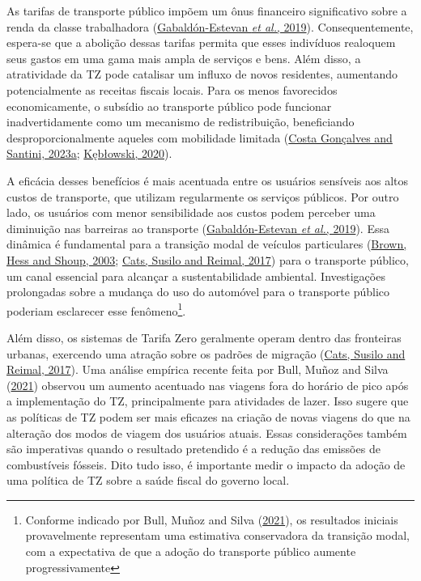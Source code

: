\documentclass[12pt, a4paper, twoside]{article}
\numberwithin{equation}{subsection} %
\begin{document}
As tarifas de transporte público impõem um ônus financeiro significativo
sobre a renda da classe trabalhadora
(\protect\hyperlink{ref-Gabaldon_ffpt_2019}{Gabaldón-Estevan \emph{et
al.}, 2019}). Consequentemente, espera-se que a abolição dessas tarifas
permita que esses indivíduos realoquem seus gastos em uma gama mais
ampla de serviços e bens. Além disso, a atratividade da TZ pode
catalisar um influxo de novos residentes, aumentando potencialmente as
receitas fiscais locais. Para os menos favorecidos economicamente, o
subsídio ao transporte público pode funcionar inadvertidamente como um
mecanismo de redistribuição, beneficiando desproporcionalmente aqueles
com mobilidade limitada
(\protect\hyperlink{ref-Costa_Gonuxe7alves_Santini_2023}{Costa Gonçalves
and Santini, 2023a};
\protect\hyperlink{ref-keblowski_why_2020}{Kębłowski, 2020}).

A eficácia desses benefícios é mais acentuada entre os usuários
sensíveis aos altos custos de transporte, que utilizam regularmente os
serviços públicos. Por outro lado, os usuários com menor sensibilidade
aos custos podem perceber uma diminuição nas barreiras ao transporte
(\protect\hyperlink{ref-Gabaldon_ffpt_2019}{Gabaldón-Estevan \emph{et
al.}, 2019}). Essa dinâmica é fundamental para a transição modal de
veículos particulares (\protect\hyperlink{ref-Brown_2003}{Brown, Hess
and Shoup, 2003}; \protect\hyperlink{ref-cats_prospects_2017}{Cats,
Susilo and Reimal, 2017}) para o transporte público, um canal essencial
para alcançar a sustentabilidade ambiental. Investigações prolongadas
sobre a mudança do uso do automóvel para o transporte público poderiam
esclarecer esse fenômeno\footnote{Conforme indicado por Bull, Muñoz and
  Silva (\protect\hyperlink{ref-BULL-RCT-2021}{2021}), os resultados
  iniciais provavelmente representam uma estimativa conservadora da
  transição modal, com a expectativa de que a adoção do transporte
  público aumente progressivamente}.

Além disso, os sistemas de Tarifa Zero geralmente operam dentro das
fronteiras urbanas, exercendo uma atração sobre os padrões de migração
(\protect\hyperlink{ref-cats_prospects_2017}{Cats, Susilo and Reimal,
2017}). Uma análise empírica recente feita por Bull, Muñoz and Silva
(\protect\hyperlink{ref-BULL-RCT-2021}{2021}) observou um aumento
acentuado nas viagens fora do horário de pico após a implementação do
TZ, principalmente para atividades de lazer. Isso sugere que as
políticas de TZ podem ser mais eficazes na criação de novas viagens do
que na alteração dos modos de viagem dos usuários atuais. Essas
considerações também são imperativas quando o resultado pretendido é a
redução das emissões de combustíveis fósseis. Dito tudo isso, é
importante medir o impacto da adoção de uma política de TZ sobre a saúde
fiscal do governo local.
\end{document}
